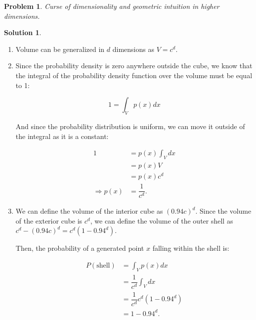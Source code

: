 \documentclass[letterpaper, 12pt]{article}
\newtheorem{problem}{Problem}
\theoremstyle{definition}
\newtheorem*{solution}{Solution}
\begin{document}
\pagebreak

\begin{problem}
Curse of dimensionality and geometric intuition in higher dimensions.
\end{problem}

\begin{solution}\
	\begin{enumerate}[1.]
    	\item Volume can be generalized in $d$ dimensions as $V = c^{d}$.
        
        \item Since the probability density is zero anywhere outside the cube, we know that the integral of the probability density function over the volume must be equal to 1:
        
        \begin{equation*}
            	1 = \int_{V} p(x) dx
        \end{equation*}
        
        And since the probability distribution is uniform, we can move it outside of the integral as it is a constant:
        
        \begin{equation*}
        	\begin{split}
            	1 & = p(x) \int_{V} dx\\
                & = p(x)V\\
                & = p(x)c^{d}\\
                \Rightarrow p(x) & = \dfrac{1}{c^{d}}.
            \end{split}
        \end{equation*}
        
        \item We can define the volume of the interior cube as $(0.94c)^{d}$. Since the volume of the exterior cube is $c^{d}$, we can define the volume of the outer shell as $c^{d} - (0.94c)^{d} = c^{d}(1-0.94^{d})$.
        
        Then, the probability of a generated point $x$ falling within the shell is:
        
        \begin{equation*}
        	\begin{split}
            	P(\text{shell}) & = \int_{V} p(x) dx \\
                & = \dfrac{1}{c^{d}} \int_{V} dx \\
                & = \dfrac{1}{c^{d}} c^{d} (1-0.94^{d}) \\
                & = 1 - 0.94^{d}.
            \end{split}
        \end{equation*}
        

\end{enumerate}
\end{solution}
\end{document}
